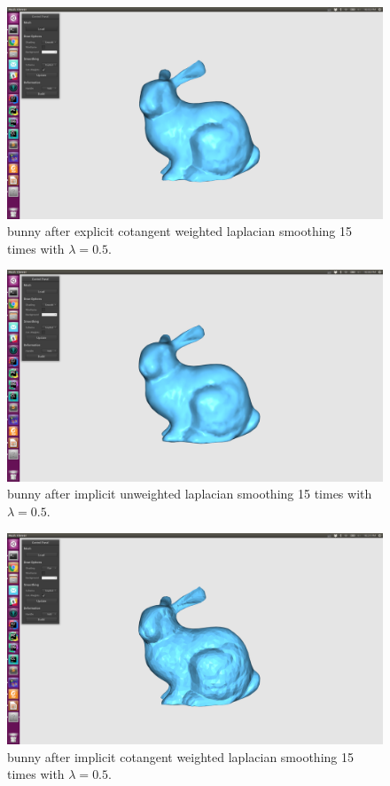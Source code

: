 \documentclass[twocolumn, a4paper]{article}
\begin{document}
\begin{figure}[H]
	\centering
	\includegraphics[width=1.0\linewidth]{bunny_ec_15.png}
	\caption{bunny after explicit cotangent weighted laplacian smoothing 15 times with $\lambda=0.5$.}
\end{figure}
\begin{figure}[H]
	\centering
	\includegraphics[width=1.0\linewidth]{bunny_in_15.png}
	\caption{bunny after implicit unweighted laplacian smoothing 15 times with $\lambda=0.5$.}
\end{figure}
\begin{figure}[H]
	\centering
	\includegraphics[width=1.0\linewidth]{bunny_ic_15.png}
	\caption{bunny after implicit cotangent weighted laplacian smoothing 15 times with $\lambda=0.5$.}
\end{figure}
\end{document}
